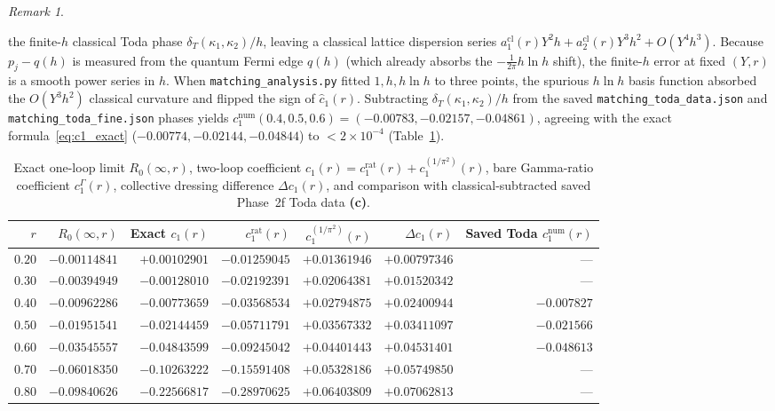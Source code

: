 \documentclass[11pt,a4paper]{article}
\newcommand{\Lc}{\textsf{\textbf{(c)}}}
\theoremstyle{remark}
\newtheorem{remark}[theorem]{Remark}
\begin{document}
\begin{remark}
\begin{enumerate}
  the finite-$h$ classical Toda phase $\delta_T(\kappa_1,\kappa_2)/h$, leaving a classical lattice
  dispersion series $a_1^{\mathrm{cl}}(r)Y^2 h + a_2^{\mathrm{cl}}(r)Y^3 h^2 + O(Y^4 h^3)$. Because
  $p_j - q(h)$ is measured from the quantum Fermi edge $q(h)$ (which already absorbs the $-\frac{1}{2\pi}h\ln h$
  shift), the finite-$h$ error at fixed $(Y,r)$ is a smooth power series in $h$. When
  \texttt{matching\_analysis.py} fitted $1, h, h\ln h$ to three points, the spurious $h\ln h$ basis
  function absorbed the $O(Y^3 h^2)$ classical curvature and flipped the sign of $\widehat{c}_1(r)$.
  Subtracting $\delta_T(\kappa_1,\kappa_2)/h$ from the saved \texttt{matching\_toda\_data.json} and
  \texttt{matching\_toda\_fine.json} phases yields $c_1^{\mathrm{num}}(0.4,0.5,0.6) = (-0.00783, -0.02157, -0.04861)$,
  agreeing with the exact formula~\eqref{eq:c1_exact} ($-0.00774, -0.02144, -0.04844$) to $<2\times 10^{-4}$
  (Table~\ref{tab:c1_table}).
\end{enumerate}
\end{remark}

\begin{table}[htbp]
\centering\small
\caption{Exact one-loop limit $R_0(\infty,r)$, two-loop coefficient $c_1(r) = c_1^{\mathrm{rat}}(r) + c_1^{(1/\pi^2)}(r)$,
bare Gamma-ratio coefficient $c_1^\Gamma(r)$, collective dressing difference $\Delta c_1(r)$, and comparison
with classical-subtracted saved Phase~2f Toda data \Lc.}
\label{tab:c1_table}
\begin{tabular}{@{}rrrrrrr@{}}
\toprule
$r$ & $R_0(\infty,r)$ & Exact $c_1(r)$ & $c_1^{\mathrm{rat}}(r)$ & $c_1^{(1/\pi^2)}(r)$ &
$\Delta c_1(r)$ & Saved Toda $c_1^{\mathrm{num}}(r)$ \\
\midrule
$0.20$ & $-0.00114841$ & $+0.00102901$ & $-0.01259045$ & $+0.01361946$ & $+0.00797346$ & --- \\
$0.30$ & $-0.00394949$ & $-0.00128010$ & $-0.02192391$ & $+0.02064381$ & $+0.01520342$ & --- \\
$0.40$ & $-0.00962286$ & $-0.00773659$ & $-0.03568534$ & $+0.02794875$ & $+0.02400944$ & $-0.007827$ \\
$0.50$ & $-0.01951541$ & $-0.02144459$ & $-0.05711791$ & $+0.03567332$ & $+0.03411097$ & $-0.021566$ \\
$0.60$ & $-0.03545557$ & $-0.04843599$ & $-0.09245042$ & $+0.04401443$ & $+0.04531401$ & $-0.048613$ \\
$0.70$ & $-0.06018350$ & $-0.10263222$ & $-0.15591408$ & $+0.05328186$ & $+0.05749850$ & --- \\
$0.80$ & $-0.09840626$ & $-0.22566817$ & $-0.28970625$ & $+0.06403809$ & $+0.07062813$ & --- \\
\bottomrule
\end{tabular}
\end{table}
\end{document}
